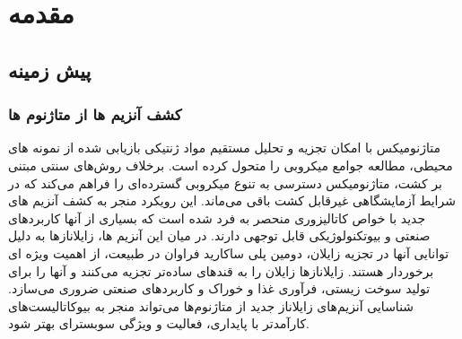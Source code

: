 \chapter{مقدمه}
    \section{ پیش زمینه}
        \subsection{کشف آنزیم ها از متاژنوم ها}
            متاژنومیکس با امکان تجزیه و تحلیل مستقیم مواد ژنتیکی بازیابی شده از نمونه های محیطی، مطالعه جوامع میکروبی را متحول کرده است. برخلاف روش‌های سنتی مبتنی بر کشت، متاژنومیکس دسترسی به تنوع میکروبی گسترده‌ای را فراهم می‌کند که در شرایط آزمایشگاهی غیرقابل کشت باقی می‌ماند. این رویکرد منجر به کشف آنزیم های جدید با خواص کاتالیزوری منحصر به فرد شده است که بسیاری از آنها کاربردهای صنعتی و بیوتکنولوژیکی قابل توجهی دارند.
            در میان این آنزیم ها، زایلانازها به دلیل توانایی آنها در تجزیه زایلان، دومین پلی ساکارید فراوان در طبیعت، از اهمیت ویژه ای برخوردار هستند. زایلانازها زایلان را به قندهای ساده‌تر تجزیه می‌کنند و آنها را برای تولید سوخت زیستی، فرآوری غذا و خوراک و کاربردهای صنعتی ضروری می‌سازد. شناسایی آنزیم‌های زایلاناز جدید از متاژنوم‌ها می‌تواند منجر به بیوکاتالیست‌های کارآمدتر با پایداری، فعالیت و ویژگی سوبسترای بهتر شود.
